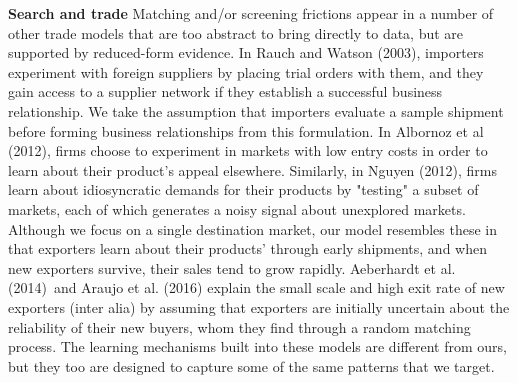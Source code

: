 \documentclass[12pt]{article}
\begin{document}
\textbf{Search and trade} Matching and/or screening frictions appear in a
number of other trade models that are too abstract to bring directly to
data, but are supported by reduced-form evidence. In Rauch and Watson
(2003), importers experiment with foreign suppliers by placing trial orders
with them, and they gain access to a supplier network if they establish a
successful business relationship. We take the assumption that importers
evaluate a sample shipment before forming business relationships from this
formulation. In Albornoz et al (2012), firms choose to experiment in markets
with low entry costs in order to learn about their product's appeal
elsewhere. Similarly, in Nguyen (2012), firms learn about idiosyncratic
demands for their products by "testing" a subset of markets, each of which
generates a noisy signal about unexplored markets. Although we focus on
a single destination market, our model resembles these in that exporters
learn about their products' through early shipments, and when new exporters
survive, their sales tend to grow rapidly. Aeberhardt et al. (2014)\ and
Araujo et al. (2016) explain the small scale and high exit rate of new
exporters (inter alia) by assuming that exporters are initially uncertain
about the reliability of their new buyers, whom they find through a random
matching process. The learning mechanisms built into these models are
different from ours, but they too are designed to capture some of the same
patterns that we target. 
\end{document}
